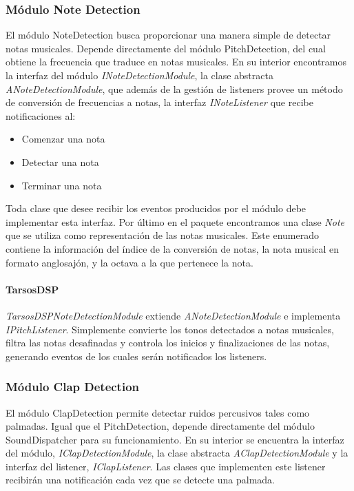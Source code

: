 \subsubsection{Módulo Note Detection}
El módulo NoteDetection busca proporcionar una manera simple de detectar notas musicales. Depende directamente del módulo PitchDetection, del cual obtiene la frecuencia que traduce en notas musicales.
En su interior encontramos la interfaz del módulo \textit{INoteDetectionModule}, la clase abstracta \textit{ANoteDetectionModule}, que además de la gestión de listeners provee un método de conversión de frecuencias a notas, la interfaz \textit{INoteListener} que recibe notificaciones al:
\begin{itemize}
	\item Comenzar una nota
	\item Detectar una nota
	\item Terminar una nota
\end{itemize}
 Toda clase que desee recibir los eventos producidos por el módulo debe implementar esta interfaz.
 Por último en el paquete encontramos una clase \textit{Note} que se utiliza como representación de las notas musicales. Este enumerado contiene la información del índice de la conversión de notas, la nota musical en formato anglosajón, y la octava a la que pertenece la nota.
 
 \paragraph*{TarsosDSP\\}%
 
 \textit{TarsosDSPNoteDetectionModule} extiende \textit{ANoteDetectionModule} e implementa \textit{IPitchListener}. Simplemente convierte los tonos detectados a notas musicales, filtra las notas desafinadas y controla los inicios y finalizaciones de las notas, generando eventos de los cuales serán notificados los listeners.
\subsubsection{Módulo Clap Detection}
El módulo ClapDetection permite detectar ruidos percusivos tales como palmadas. Igual que el PitchDetection, depende directamente del módulo SoundDispatcher para su funcionamiento. En su interior se encuentra la interfaz del módulo, \textit{IClapDetectionModule}, la clase abstracta \textit{AClapDetectionModule} y la interfaz del listener, \textit{IClapListener}. Las clases que implementen este listener recibirán una notificación cada vez que se detecte una palmada.
